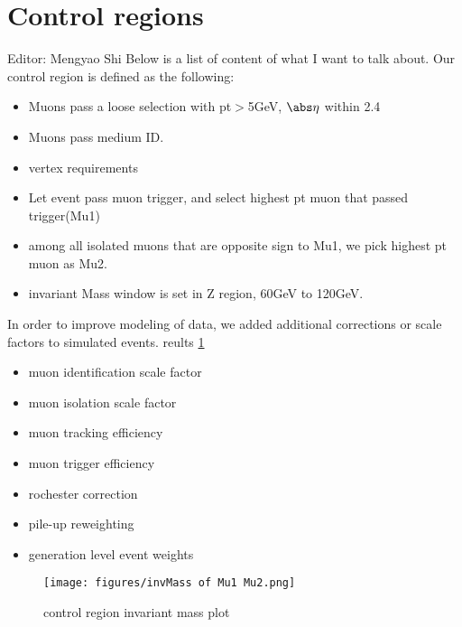\section{Control regions\label{sec:controlregions}}

Editor: Mengyao Shi
Below is a list of content of what I want to talk about. 
Our control region is defined as the following: 
\begin{itemize}
  \item Muons pass a loose selection with pt$>$5GeV, $\abs\eta$ within 2.4
  \item Muons pass medium ID. 
  \item vertex requirements
  \item Let event pass muon trigger, and select highest pt muon that passed trigger(Mu1)
  \item among all isolated muons that are opposite sign to Mu1, we pick highest pt muon as Mu2.
  \item invariant Mass window is set in Z region, 60GeV to 120GeV.
\end{itemize}

In order to improve modeling of data, we added additional corrections or scale factors to simulated events.
reults \ref{fig:invMass}
\begin{itemize}
  \item muon identification scale factor
  \item muon isolation scale factor
  \item muon tracking efficiency
  \item muon trigger efficiency
  \item rochester correction
  \item pile-up reweighting
  \item generation level event weights
\end{itemize}

\begin{figure}
  \centering
  \texttt{[image: figures/invMass of Mu1 Mu2.png]}
    \captionsetup{format=hang}
  \caption{control region invariant mass plot}
  \label{fig:invMass}
\end{figure}

